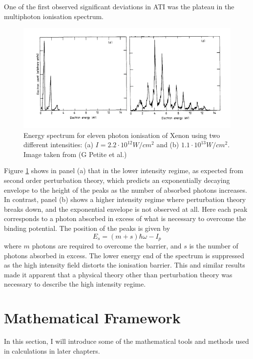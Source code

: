 \documentclass[11pt]{article}
\numberwithin{equation}{section}
\begin{document}
\par
One of the first observed significant deviations in ATI was the plateau in the multiphoton ionisation spectrum.\cite{gpetite_1988_intensity} 
\begin{figure}[!htb]
    \centering
    \includegraphics[width=12cm]{Figures/atiSpectrum.png}
    \caption{Energy spectrum for eleven photon ionisation of Xenon using two different intensities: (a) $I = 2.2 \cdot 10^{12} W/cm^2$ and (b) $1.1 \cdot 10^{13} W/cm^2$. Image taken from (G Petite et al.)\cite{gpetite_1988_intensity}}
    \label{fig:ATISpec}
\end{figure}
Figure \ref{fig:ATISpec} shows in panel (a) that in the lower intensity regime, as expected from second order perturbation theory, which predicts an exponentially decaying envelope to the height of the peaks as the number of absorbed photons increases. In contrast, panel (b) shows a higher intensity regime where perturbation theory breaks down, and the exponential envelope is not observed at all. Here each peak corresponds to a photon absorbed in excess of what is necessary to overcome the binding potential.
The position of the peaks is given by 
\begin{equation}
    E_s = (m+s)\hbar\omega - I_p
\end{equation}
where $m$ photons are required to overcome the barrier, and $s$ is the number of photons absorbed in excess. The lower energy end of the spectrum is suppressed as the high intensity field distorts the ionisation barrier. This and similar results made it apparent that a physical theory other than perturbation theory was necessary to describe the high intensity regime.

\section{Mathematical Framework}
In this section, I will introduce some of the mathematical tools and methods used in calculations in later chapters.
\end{document}
